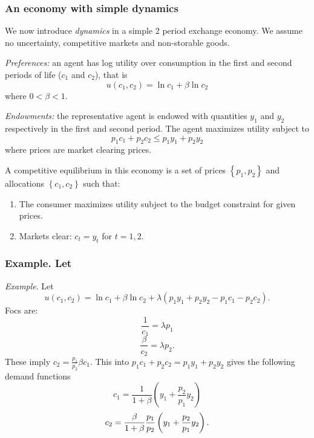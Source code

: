 \documentclass[aspectratio=169]{ltx-talk}
\begin{document}
\begin{frame}
\frametitle{An economy with simple dynamics}
We now introduce \textit{dynamics} in a simple 2 period exchange economy. We
assume no uncertainty, competitive markets and non-storable goods.

\textit{Preferences: }an agent has log utility over consumption in the first
and second periods of life ($c_{1}$ and $c_{2}$), that is 
\begin{equation*}
u\left( c_{1},c_{2}\right) =\ln c_{1}+\beta \ln c_{2}
\end{equation*}%
where $0<\beta <1.$

\textit{Endowments:} the representative agent is endowed with quantities $%
y_{1}$ and $y_{2}$ respectively in the first and second period. The agent
maximizes utility subject to%
\begin{equation*}
p_{1}c_{1}+p_{2}c_{2}\leq p_{1}y_{1}+p_{2}y_{2}
\end{equation*}%
where prices are market clearing prices.

A competitive equilibrium in this economy is a set of prices $\left\{
p_{1},p_{2}\right\} $ and allocations $\left\{ c_{1},c_{2}\right\} $ such
that:

\begin{enumerate}
\item The consumer maximizes utility subject to the budget constraint for
given prices.

\item Markets clear: $c_{t}=y_{t}$ for $t=1,2$.
\end{enumerate}
\end{frame}

\begin{frame}
\frametitle{Example. Let}
\textit{Example}. Let%
\begin{equation*}
u\left( c_{1},c_{2}\right) =\ln c_{1}+\beta \ln c_{2}+\lambda \left(
p_{1}y_{1}+p_{2}y_{2}-p_{1}c_{1}-p_{2}c_{2}\right) .
\end{equation*}%
Focs are:%
\begin{equation*}
\frac{1}{c_{1}}=\lambda p_{1}
\end{equation*}%
\begin{equation*}
\frac{\beta }{c_{2}}=\lambda p_{2}.
\end{equation*}%
These imply $c_{2}=\frac{p_{1}}{p_{2}}\beta c_{1}.$ This into $%
p_{1}c_{1}+p_{2}c_{2}=p_{1}y_{1}+p_{2}y_{2}$ gives the following demand
functions%
\begin{equation*}
c_{1}=\frac{1}{1+\beta }\left( y_{1}+\frac{p_{2}}{p_{1}}y_{2}\right)
\end{equation*}%
\begin{equation*}
c_{2}=\frac{\beta }{1+\beta }\frac{p_{1}}{p_{2}}\left( y_{1}+\frac{p_{2}}{%
p_{1}}y_{2}\right) .
\end{equation*}%
\end{frame}
\end{document}
